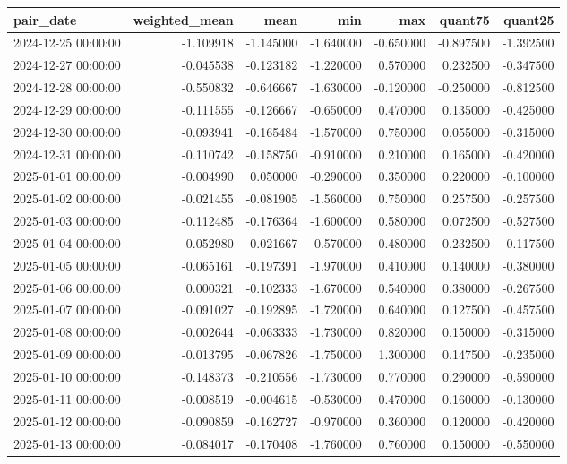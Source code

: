 \begin{tabular}{lrrrrrr}
\toprule
pair_date & weighted_mean & mean & min & max & quant75 & quant25 \\
\midrule
2024-12-25 00:00:00 & -1.109918 & -1.145000 & -1.640000 & -0.650000 & -0.897500 & -1.392500 \\
2024-12-27 00:00:00 & -0.045538 & -0.123182 & -1.220000 & 0.570000 & 0.232500 & -0.347500 \\
2024-12-28 00:00:00 & -0.550832 & -0.646667 & -1.630000 & -0.120000 & -0.250000 & -0.812500 \\
2024-12-29 00:00:00 & -0.111555 & -0.126667 & -0.650000 & 0.470000 & 0.135000 & -0.425000 \\
2024-12-30 00:00:00 & -0.093941 & -0.165484 & -1.570000 & 0.750000 & 0.055000 & -0.315000 \\
2024-12-31 00:00:00 & -0.110742 & -0.158750 & -0.910000 & 0.210000 & 0.165000 & -0.420000 \\
2025-01-01 00:00:00 & -0.004990 & 0.050000 & -0.290000 & 0.350000 & 0.220000 & -0.100000 \\
2025-01-02 00:00:00 & -0.021455 & -0.081905 & -1.560000 & 0.750000 & 0.257500 & -0.257500 \\
2025-01-03 00:00:00 & -0.112485 & -0.176364 & -1.600000 & 0.580000 & 0.072500 & -0.527500 \\
2025-01-04 00:00:00 & 0.052980 & 0.021667 & -0.570000 & 0.480000 & 0.232500 & -0.117500 \\
2025-01-05 00:00:00 & -0.065161 & -0.197391 & -1.970000 & 0.410000 & 0.140000 & -0.380000 \\
2025-01-06 00:00:00 & 0.000321 & -0.102333 & -1.670000 & 0.540000 & 0.380000 & -0.267500 \\
2025-01-07 00:00:00 & -0.091027 & -0.192895 & -1.720000 & 0.640000 & 0.127500 & -0.457500 \\
2025-01-08 00:00:00 & -0.002644 & -0.063333 & -1.730000 & 0.820000 & 0.150000 & -0.315000 \\
2025-01-09 00:00:00 & -0.013795 & -0.067826 & -1.750000 & 1.300000 & 0.147500 & -0.235000 \\
2025-01-10 00:00:00 & -0.148373 & -0.210556 & -1.730000 & 0.770000 & 0.290000 & -0.590000 \\
2025-01-11 00:00:00 & -0.008519 & -0.004615 & -0.530000 & 0.470000 & 0.160000 & -0.130000 \\
2025-01-12 00:00:00 & -0.090859 & -0.162727 & -0.970000 & 0.360000 & 0.120000 & -0.420000 \\
2025-01-13 00:00:00 & -0.084017 & -0.170408 & -1.760000 & 0.760000 & 0.150000 & -0.550000 \\

\end{tabular}
